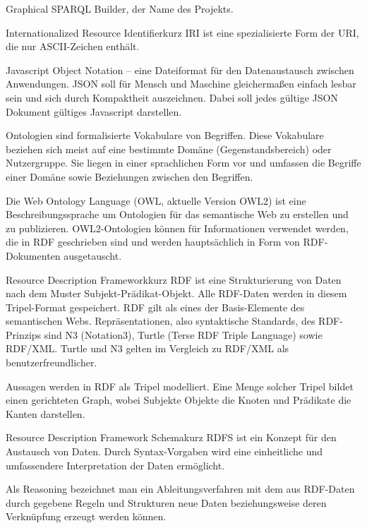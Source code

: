 {Graphical SPARQL Builder, der Name des Projekts. \cite{swp14-gsb}}

{\glqq Internationalized Resource Identifier\grqq kurz IRI ist eine spezialisierte Form der URI, die
 nur ASCII-Zeichen enthält. \cite{iri,rfc3987}}

{Javascript Object Notation -- eine Dateiformat für den Datenaustausch zwischen Anwendungen. JSON soll für Mensch und Maschine gleichermaßen einfach lesbar sein und sich durch Kompaktheit auszeichnen. Dabei soll jedes gültige JSON Dokument gültiges Javascript darstellen.
\cite{json}
}

{Ontologien sind formalisierte Vokabulare von Begriffen. Diese Vokabulare beziehen sich meist auf eine bestimmte Domäne (Gegenstandsbereich) oder Nutzergruppe. Sie liegen in einer sprachlichen Form vor und umfassen die Begriffe einer Domäne sowie Beziehungen zwischen den Begriffen. \cite{owl,ontologie-wiki,fraunhofer}
}

{Die Web Ontology Language (OWL, aktuelle Version OWL2) ist eine Beschreibungssprache um Ontologien für das semantische Web zu erstellen und zu publizieren. OWL2-Ontologien können für Informationen verwendet werden, die in RDF geschrieben sind und werden hauptsächlich in Form von RDF-Dokumenten ausgetauscht.
\cite{owl}
}

{\glqq Resource Description Framework\grqq kurz RDF ist eine Strukturierung von Daten nach
dem Muster Subjekt-Prädikat-Objekt. Alle RDF-Daten werden in diesem Tripel-Format 
gespeichert. RDF gilt als eines der Basis-Elemente des semantischen Webs.
Repräsentationen, also syntaktische Standards, des RDF-Prinzips sind N3 (Notation3), 
Turtle (Terse RDF Triple Language) sowie RDF/XML. Turtle und N3 gelten im Vergleich zu RDF/XML als benutzerfreundlicher. \cite{rdf-primer,rdf-wiki,rdf-xml-wiki}}

{Aussagen werden in RDF als Tripel modelliert. Eine Menge solcher Tripel bildet einen gerichteten Graph, wobei Subjekte Objekte die Knoten und Prädikate die Kanten darstellen. \cite{rdf-wiki}}

{\glqq Resource Description Framework Schema\grqq kurz RDFS ist ein Konzept für den 
Austausch von Daten. Durch Syntax-Vorgaben wird eine einheitliche und umfassendere
Interpretation der Daten ermöglicht. \cite{w3c-rdf-schema}}

{Als Reasoning bezeichnet man ein Ableitungsverfahren mit dem aus RDF-Daten durch gegebene Regeln und Strukturen neue Daten beziehungsweise deren Verknüpfung erzeugt werden können. \cite{reasoning-paper,rdf-reasoning}}

